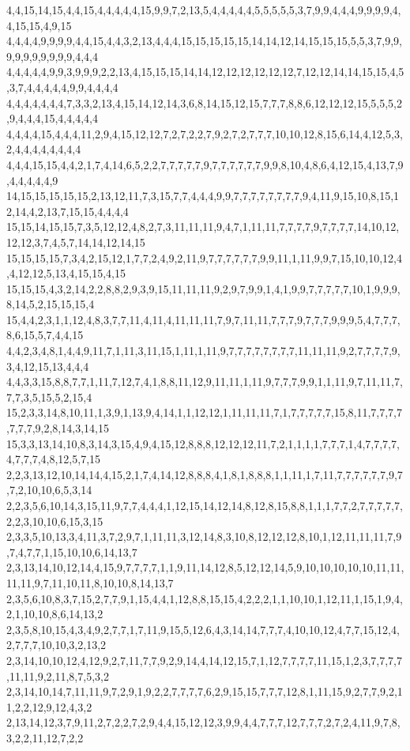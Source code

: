 4,4,15,14,15,4,4,15,4,4,4,4,4,15,9,9,7,2,13,5,4,4,4,4,4,5,5,5,5,5,3,7,9,9,4,4,4,9,9,9,9,4,4,15,15,4,9,15
4,4,4,4,9,9,9,9,4,4,15,4,4,3,2,13,4,4,4,15,15,15,15,15,14,14,12,14,15,15,15,5,5,3,7,9,9,9,9,9,9,9,9,9,9,4,4,4
4,4,4,4,4,9,9,3,9,9,9,2,2,13,4,15,15,15,14,14,12,12,12,12,12,12,7,12,12,14,14,15,15,4,5,3,7,4,4,4,4,4,9,9,4,4,4,4
4,4,4,4,4,4,4,7,3,3,2,13,4,15,14,12,14,3,6,8,14,15,12,15,7,7,7,8,8,6,12,12,12,15,5,5,5,2,9,4,4,4,15,4,4,4,4,4
4,4,4,4,15,4,4,4,11,2,9,4,15,12,12,7,2,7,2,2,7,9,2,7,2,7,7,7,10,10,12,8,15,6,14,4,12,5,3,2,4,4,4,4,4,4,4,4
4,4,4,15,15,4,4,2,1,7,4,14,6,5,2,2,7,7,7,7,7,9,7,7,7,7,7,7,9,9,8,10,4,8,6,4,12,15,4,13,7,9,4,4,4,4,4,9
14,15,15,15,15,15,2,13,12,11,7,3,15,7,7,4,4,4,9,9,7,7,7,7,7,7,7,7,9,4,11,9,15,10,8,15,12,14,4,2,13,7,15,15,4,4,4,4
15,15,14,15,15,7,3,5,12,12,4,8,2,7,3,11,11,11,9,4,7,1,11,11,7,7,7,7,9,7,7,7,7,14,10,12,12,12,3,7,4,5,7,14,14,12,14,15
15,15,15,15,7,3,4,2,15,12,1,7,7,2,4,9,2,11,9,7,7,7,7,7,7,9,9,11,1,11,9,9,7,15,10,10,12,4,4,12,12,5,13,4,15,15,4,15
15,15,15,4,3,2,14,2,2,8,8,2,9,3,9,15,11,11,11,9,2,9,7,9,9,1,4,1,9,9,7,7,7,7,7,10,1,9,9,9,8,14,5,2,15,15,15,4
15,4,4,2,3,1,1,12,4,8,3,7,7,11,4,11,4,11,11,11,7,9,7,11,11,7,7,7,9,7,7,7,9,9,9,5,4,7,7,7,8,6,15,5,7,4,4,15
4,4,2,3,4,8,1,4,4,9,11,7,1,11,3,11,15,1,11,1,11,9,7,7,7,7,7,7,7,7,11,11,11,9,2,7,7,7,7,9,3,4,12,15,13,4,4,4
4,4,3,3,15,8,8,7,7,1,11,7,12,7,4,1,8,8,11,12,9,11,11,1,11,9,7,7,7,9,9,1,1,11,9,7,11,11,7,7,7,3,5,15,5,2,15,4
15,2,3,3,14,8,10,11,1,3,9,1,13,9,4,14,1,1,12,12,1,11,11,11,7,1,7,7,7,7,7,15,8,11,7,7,7,7,7,7,7,9,2,8,14,3,14,15
15,3,3,13,14,10,8,3,14,3,15,4,9,4,15,12,8,8,8,12,12,12,11,7,2,1,1,1,1,7,7,7,1,4,7,7,7,7,4,7,7,7,4,8,12,5,7,15
2,2,3,13,12,10,14,14,4,15,2,1,7,4,14,12,8,8,8,4,1,8,1,8,8,8,1,1,11,1,7,11,7,7,7,7,7,7,9,7,7,2,10,10,6,5,3,14
2,2,3,5,6,10,14,3,15,11,9,7,7,4,4,4,1,12,15,14,12,14,8,12,8,15,8,8,1,1,1,7,7,2,7,7,7,7,7,2,2,3,10,10,6,15,3,15
2,3,3,5,10,13,3,4,11,3,7,2,9,7,1,11,11,3,12,14,8,3,10,8,12,12,12,8,10,1,12,11,11,11,7,9,7,4,7,7,1,15,10,10,6,14,13,7
2,3,13,14,10,12,14,4,15,9,7,7,7,7,1,1,9,11,14,12,8,5,12,12,14,5,9,10,10,10,10,10,11,11,11,11,9,7,11,10,11,8,10,10,8,14,13,7
2,3,5,6,10,8,3,7,15,2,7,7,9,1,15,4,4,1,12,8,8,15,15,4,2,2,2,1,1,10,10,1,12,11,1,15,1,9,4,2,1,10,10,8,6,14,13,2
2,3,5,8,10,15,4,3,4,9,2,7,7,1,7,11,9,15,5,12,6,4,3,14,14,7,7,7,4,10,10,12,4,7,7,15,12,4,2,7,7,7,10,10,3,2,13,2
2,3,14,10,10,12,4,12,9,2,7,11,7,7,9,2,9,14,4,14,12,15,7,1,12,7,7,7,7,11,15,1,2,3,7,7,7,7,11,11,9,2,11,8,7,5,3,2
2,3,14,10,14,7,11,11,9,7,2,9,1,9,2,2,7,7,7,7,6,2,9,15,15,7,7,7,12,8,1,11,15,9,2,7,7,9,2,11,2,2,12,9,12,4,3,2
2,13,14,12,3,7,9,11,2,7,2,2,7,2,9,4,4,15,12,12,3,9,9,4,4,7,7,7,12,7,7,7,2,7,2,4,11,9,7,8,3,2,2,11,12,7,2,2
